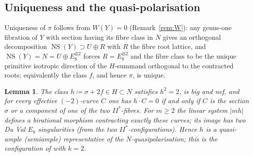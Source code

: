 \documentclass[11pt]{article}
\newtheorem{lemma}[theorem]{Lemma}
\DeclareMathOperator{\NS}{NS}
\begin{document}
\subsection{Uniqueness and the quasi-polarisation}

Uniqueness of $\pi$ follows from $W(Y)=0$ (Remark~\ref{rem:W}): any
genus-one fibration of $Y$ with section having its fibre class in $N$ gives
an orthogonal decomposition $\NS(Y)\supset U\oplus R$ with $R$ the fibre
root lattice, and $\NS(Y)=N=U\oplus E_8^{\oplus2}$ forces $R=E_8^{\oplus2}$
and the fibre class to be the unique primitive isotropic direction of the
$H$-summand orthogonal to the contracted roots; equivalently the class $f$,
and hence $\pi$, is unique.


\begin{lemma}\label{lem:quasi}
The class $h\coloneqq\sigma+2f\in H\subset N$ satisfies $h^2=2$, is big and
nef, and for every effective $(-2)$-curve $C$ one has $h\cdot C=0$ if and
only if $C$ is the section $\sigma$ or a component of one of the two
$II^*$-fibres. For $m\ge 2$ the linear system $|mh|$ defines a birational
morphism contracting exactly these curves; its image has two Du Val $E_8$
singularities (from the two $II^*$-configurations). Hence $h$ is a
quasi-ample (semiample) representative of the $N$-quasipolarisation; this
is the configuration of {} with $k=2$.
\end{lemma}

\end{document}

